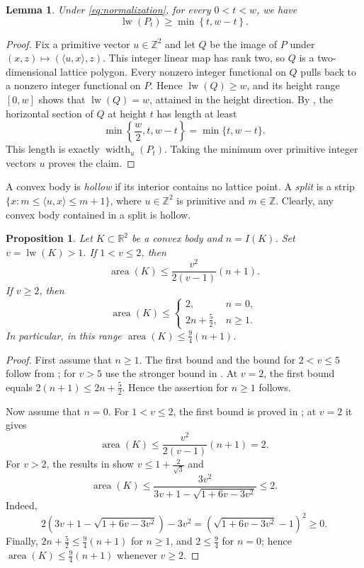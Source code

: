 \documentclass[reqno, 11pt]{article}
\numberwithin{equation}{section}
\newtheorem{proposition}[proposition]{Proposition}
\newtheorem{lemma}[lemma]{Lemma}
\theoremstyle{definition}
\newcommand{\R}{\mathbb R}
\newcommand{\Z}{\mathbb Z}
\DeclareMathOperator{\area}{area}
\DeclareMathOperator{\lw}{lw}
\numberwithin{equation}{section}
\begin{document}
\begin{lemma}\label{p:sections}
Under \eqref{eq:normalization}, for every $0<t<w$, we have 
\[ \lw(P_t)\ge\min\left\{t,w-t\right\}.
\]
\end{lemma}
\begin{proof}
Fix a primitive vector $u\in\Z^2$ and let $Q$ be the image of $P$
under $(x,z)\mapsto(\langle u,x\rangle,z)$.
This integer linear map has rank two, so $Q$ is a two-dimensional
lattice polygon. Every nonzero integer functional on \(Q\) pulls back to a nonzero integer functional on \(P\). Hence $\lw(Q)\ge w$, and its height range $[0,w]$ shows that
$\lw(Q)=w$, attained in the height direction. By \cite[Lemma~2.12]{Bohnert2023}, the horizontal section of $Q$
at height $t$ has length at least
\[
\min\left\{\frac{w}{2},t,w-t\right\}=\min\{t,w-t\}.
\]
This length is exactly $\operatorname{width}_u(P_t)$.
Taking the minimum over primitive integer vectors $u$ proves the claim.
\end{proof}


A convex body is \emph{hollow} if its interior contains no
lattice point. A \emph{split} is a strip
$\{x:m\le\langle u,x\rangle\le m+1\}$, where $u\in\Z^2$ is
primitive and $m\in\Z$. Clearly, any convex body contained in a split is hollow.

\begin{proposition}\label{p:width}
Let $K\subset\R^2$ be a convex body and $n=I(K)$. Set $v=\lw(K)>1$. If $1<v\le2$, then
\[\area(K)\le\frac{v^2}{2(v-1)}(n+1).
\]
If $v\ge2$, then
\[\area(K)\le\begin{cases}2,&n=0,\\ 2n+\frac{5}{2},&n\ge1.\end{cases}
\]
In particular, in this range $\area(K)\le\frac94(n+1)$.
\end{proposition}
\begin{proof}
First assume that $n\ge1$.  The first bound and the bound for $2<v\le5$ follow from \cite[Theorem~1.2]{Bohnert2023}; 
for $v>5$ use the stronger bound in \cite[Theorem~1.1]{Bohnert2023}. 
At $v=2$, the first bound equals $2(n+1)\le2n+\frac52$.
Hence the assertion for $n\ge1$ follows.

Now assume that $n=0$. For $1<v\le2$, the first bound is proved in
\cite[Theorem~2.2]{AW2012}; at $v=2$ it gives
\[
\area(K)\le\frac{v^2}{2(v-1)}(n+1)=2.
\]
For $v>2$, the results in \cite[Theorems~2.1 and 2.2]{AW2012} show $v\le1+\frac2{\sqrt3}$ and
\[
\area(K)\le\frac{3v^2}{3v+1-\sqrt{1+6v-3v^2}}\le2.
\]
Indeed,
\[
2\left(3v+1-\sqrt{1+6v-3v^2}\right)-3v^2
=\left(\sqrt{1+6v-3v^2}-1\right)^2\ge0.
\]
Finally, $2n+\frac52\le\frac94(n+1)$ for $n\ge1$, and $2\le\frac94$
for $n=0$; hence $\area(K)\le\frac94(n+1)$ whenever $v\ge2$.
\end{proof}
\end{document}
